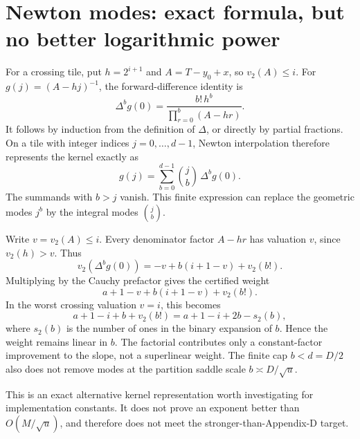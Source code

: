 \section{Newton modes: exact formula, but no better logarithmic power}
For a crossing tile, put $h=2^{i+1}$ and
$A=T-y_0+x$, so $v_2(A)\le i$. For
$g(j)=(A-hj)^{-1}$, the forward-difference identity is
\[
 \Delta^b g(0)=
 \frac{b!\,h^b}{\prod_{r=0}^{b}(A-hr)}.
\]
It follows by induction from the definition of $\Delta$, or directly by
partial fractions. On a tile with integer indices $j=0,\ldots,d-1$,
Newton interpolation therefore represents the kernel exactly as
\[
 g(j)=\sum_{b=0}^{d-1}\binom jb\,\Delta^b g(0).
\]
The summands with $b>j$ vanish. This finite expression can replace the
geometric modes $j^b$ by the integral modes $\binom jb$.

Write $v=v_2(A)\le i$. Every denominator factor $A-hr$ has valuation
$v$, since $v_2(h)>v$. Thus
\[
 v_2(\Delta^b g(0))
 =-v+b(i+1-v)+v_2(b!).
\]
Multiplying by the Cauchy prefactor gives the certified weight
\[
 a+1-v+b(i+1-v)+v_2(b!).
\]
In the worst crossing valuation $v=i$, this becomes
\[
 a+1-i+b+v_2(b!)=a+1-i+2b-s_2(b),
\]
where $s_2(b)$ is the number of ones in the binary expansion of $b$.
Hence the weight remains linear in $b$. The factorial contributes only
a constant-factor improvement to the slope, not a superlinear weight.
The finite cap $b<d=D/2$ also does not remove modes at the partition
saddle scale $b\asymp D/\sqrt u$.

This is an exact alternative kernel representation worth investigating
for implementation constants. It does not prove an exponent better than
$O(M/\sqrt u)$, and therefore does not meet the stronger-than-Appendix-D
target.


